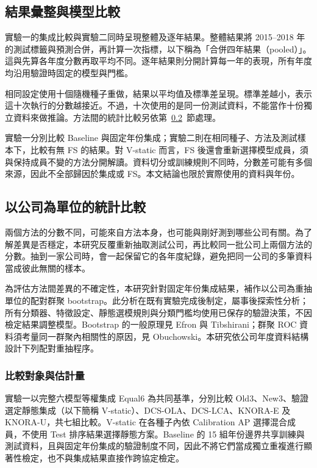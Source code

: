 \subsection{結果彙整與模型比較}

實驗一的集成比較與實驗二同時呈現整體及逐年結果。整體結果將 2015--2018 年的測試標籤與預測合併，再計算一次指標，以下稱為「合併四年結果（pooled）」。這與先算各年度分數再取平均不同。逐年結果則分開計算每一年的表現，所有年度均沿用驗證時固定的模型與門檻。

相同設定使用十個隨機種子重做，結果以平均值及標準差呈現。標準差越小，表示這十次執行的分數越接近。不過，十次使用的是同一份測試資料，不能當作十份獨立資料來做推論。方法間的統計比較另依第~\ref{sec:method-statistics}~節處理。

實驗一分別比較 Baseline 與固定年份集成；實驗二則在相同種子、方法及測試樣本下，比較有無 FS 的結果。對 V-static 而言，FS 後還會重新選擇模型成員，須與保持成員不變的方法分開解讀。資料切分或訓練規則不同時，分數差可能有多個來源，因此不全部歸因於集成或 FS。本文結論也限於實際使用的資料與年份。

\subsection{以公司為單位的統計比較}\label{sec:method-statistics}

兩個方法的分數不同，可能來自方法本身，也可能與剛好測到哪些公司有關。為了解差異是否穩定，本研究反覆重新抽取測試公司，再比較同一批公司上兩個方法的分數。抽到一家公司時，會一起保留它的各年度紀錄，避免把同一公司的多筆資料當成彼此無關的樣本。

為評估方法間差異的不確定性，本研究針對固定年份集成結果，補作以公司為重抽單位的配對群聚 bootstrap。此分析在既有實驗完成後制定，屬事後探索性分析；所有分類器、特徵設定、靜態選模規則與分類門檻均使用已保存的驗證決策，不因檢定結果調整模型。Bootstrap 的一般原理見 Efron 與 Tibshirani\autocite{efron1986bootstrap}；群聚 ROC 資料須考量同一群聚內相關性的原因，見 Obuchowski\autocite{obuchowski1997clustered}。本研究依公司年度資料結構設計下列配對重抽程序。

\subsubsection{比較對象與估計量}

實驗一以完整六模型等權集成 Equal6 為共同基準，分別比較 Old3、New3、驗證選定靜態集成（以下簡稱 V-static）、DCS-OLA、DCS-LCA、KNORA-E 及 KNORA-U，共七組比較。V-static 在各種子內依 Calibration AP 選擇混合成員，不使用 Test 排序結果選擇靜態方案。Baseline 的 15 組年份邊界共享訓練與測試資料，且與固定年份集成的驗證制度不同，因此不將它們當成獨立重複進行顯著性檢定，也不與集成結果直接作跨協定檢定。

